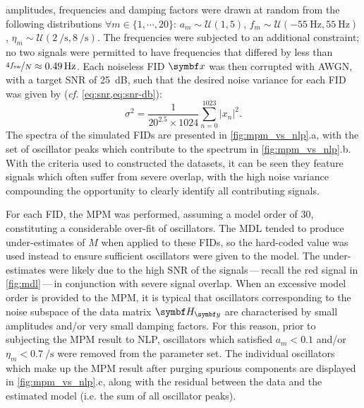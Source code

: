 amplitudes, frequencies and damping factors were drawn at random from the
following distributions
$\forall m \in \lbrace 1, \cdots, 20\rbrace$:
$a_m \sim \mathcal{U}(1, 5)$, $f_m \sim \mathcal{U}(\qty{-55}{\hertz},
\qty{55}{\hertz})$, $\eta_m \sim \mathcal{U}(\qty{2}{\per\second},
\qty{8}{\per\second})$. The frequencies were subjected to an additional
constraint; no two signals were permitted to have frequencies that
differed by less than $\nicefrac{4 f_{\mathrm{sw}}}{N} \approx \qty{0.49}{\hertz}$.
Each noiseless \ac{FID} $\bx$ was then corrupted with \ac{AWGN}, with a target
\ac{SNR} of \qty{25}{\deci\bel}, such that the desired noise variance for each
\ac{FID} was given by (\emph{cf.} \cref{eq:snr,eq:snr-db}):
\begin{equation}
    \sigma^2 = \frac{1}{20^{2.5} \times 1024}
        \sum_{n=0}^{1023} \lvert x_n \rvert^2.
\end{equation}
The spectra of the simulated \acp{FID} are presented in
\cref{fig:mpm_vs_nlp}.a, with the set of oscillator peaks which contribute
to the spectrum in \cref{fig:mpm_vs_nlp}.b. With the criteria used to
constructed the datasets, it can be seen they feature signals which often
suffer from severe overlap, with the high noise variance compounding the
opportunity to clearly identify all contributing signals.

For each \ac{FID}, the \ac{MPM} was performed, assuming a model order of
30, constituting a considerable over-fit of oscillators. The \ac{MDL} tended to
produce under-estimates of $M$ when applied to these \acp{FID}, so the
hard-coded value was used instead to ensure sufficient oscillators were given
to the model. The under-estimates were likely due to the
high \ac{SNR} of the signals\,---\,recall the red signal in \cref{fig:mdl}\,---\,in
conjunction with severe signal overlap. When an excessive model order is
provided to the \ac{MPM}, it is typical that oscillators corresponding to the
noise subspace of the data matrix $\Hy$ are characterised by small amplitudes
and/or very small damping factors. For this reason, prior to subjecting the
\ac{MPM} result to \ac{NLP}, oscillators which satisfied $a_m < 0.1$ and/or
$\eta_m < \qty{0.7}{\per\second}$ were removed from the parameter set. The
individual oscillators which make up the \ac{MPM} result after purging spurious
components are displayed in \cref{fig:mpm_vs_nlp}.c, along with the
residual between the data and the estimated model (i.e. the sum of all
oscillator peaks).

